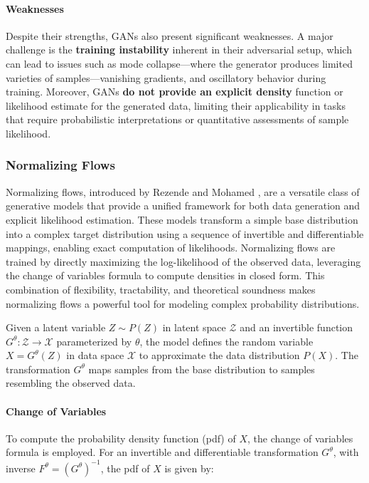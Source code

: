 \paragraph{Weaknesses} 

Despite their strengths, GANs also present significant weaknesses. A major challenge is the \textbf{training instability} inherent in their adversarial setup, which can lead to issues such as mode collapse—where the generator produces limited varieties of samples—vanishing gradients, and oscillatory behavior during training. Moreover, GANs \textbf{do not provide an explicit density} function or likelihood estimate for the generated data, limiting their applicability in tasks that require probabilistic interpretations or quantitative assessments of sample likelihood.

\subsubsection{Normalizing Flows}\label{sec:normalizing_flows}

Normalizing flows, introduced by Rezende and Mohamed \cite{rezende2015variational}, are a versatile class of generative models that provide a unified framework for both data generation and explicit likelihood estimation. These models transform a simple base distribution into a complex target distribution using a sequence of invertible and differentiable mappings, enabling exact computation of likelihoods. Normalizing flows are trained by directly maximizing the log-likelihood of the observed data, leveraging the change of variables formula to compute densities in closed form. This combination of flexibility, tractability, and theoretical soundness makes normalizing flows a powerful tool for modeling complex probability distributions.

Given a latent variable $Z \sim P(Z)$ in latent space $\mathcal{Z}$ and an invertible function $G^\theta: \mathcal{Z} \rightarrow \mathcal{X}$ parameterized by $\theta$, the model defines the random variable $X = G^\theta(Z)$ in data space $\mathcal{X}$ to approximate the data distribution $P(X)$. The transformation $G^\theta$ maps samples from the base distribution to samples resembling the observed data.

\paragraph{Change of Variables}

To compute the probability density function (pdf) of $X$, the change of variables formula is employed. For an invertible and differentiable transformation $G^\theta$, with inverse $F^\theta = (G^\theta)^{-1}$, the pdf of $X$ is given by:

